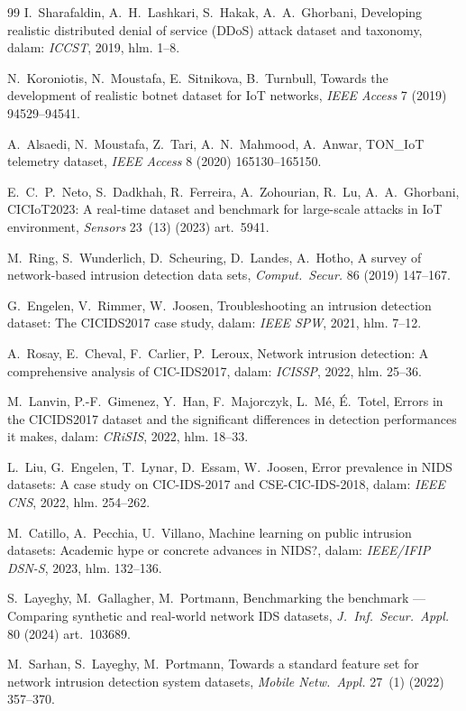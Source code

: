 \documentclass[11pt,a4paper]{article}
\begin{document}
\begin{thebibliography}{99}
 I.~Sharafaldin, A.~H.~Lashkari, S.~Hakak, A.~A.~Ghorbani,
Developing realistic distributed denial of service (DDoS) attack dataset and
taxonomy, dalam: \emph{ICCST}, 2019, hlm. 1--8.

 N.~Koroniotis, N.~Moustafa, E.~Sitnikova, B.~Turnbull, Towards the
development of realistic botnet dataset for IoT networks, \emph{IEEE Access} 7
(2019) 94529--94541.

 A.~Alsaedi, N.~Moustafa, Z.~Tari, A.~N.~Mahmood, A.~Anwar,
TON\_IoT telemetry dataset, \emph{IEEE Access} 8 (2020) 165130--165150.

 E.~C.~P.~Neto, S.~Dadkhah, R.~Ferreira, A.~Zohourian, R.~Lu,
A.~A.~Ghorbani, CICIoT2023: A real-time dataset and benchmark for large-scale
attacks in IoT environment, \emph{Sensors} 23~(13) (2023) art.~5941.

 M.~Ring, S.~Wunderlich, D.~Scheuring, D.~Landes, A.~Hotho, A survey
of network-based intrusion detection data sets, \emph{Comput.\ Secur.} 86 (2019)
147--167.

 G.~Engelen, V.~Rimmer, W.~Joosen, Troubleshooting an intrusion
detection dataset: The CICIDS2017 case study, dalam: \emph{IEEE SPW}, 2021, hlm.
7--12.

 A.~Rosay, E.~Cheval, F.~Carlier, P.~Leroux, Network intrusion
detection: A comprehensive analysis of CIC-IDS2017, dalam: \emph{ICISSP}, 2022,
hlm. 25--36.

 M.~Lanvin, P.-F.~Gimenez, Y.~Han, F.~Majorczyk, L.~M\'e, \'E.~Totel,
Errors in the CICIDS2017 dataset and the significant differences in detection
performances it makes, dalam: \emph{CRiSIS}, 2022, hlm. 18--33.

 L.~Liu, G.~Engelen, T.~Lynar, D.~Essam, W.~Joosen, Error prevalence in
NIDS datasets: A case study on CIC-IDS-2017 and CSE-CIC-IDS-2018, dalam: \emph{IEEE
CNS}, 2022, hlm. 254--262.

 M.~Catillo, A.~Pecchia, U.~Villano, Machine learning on public
intrusion datasets: Academic hype or concrete advances in NIDS?, dalam:
\emph{IEEE/IFIP DSN-S}, 2023, hlm. 132--136.

 S.~Layeghy, M.~Gallagher, M.~Portmann, Benchmarking the benchmark
--- Comparing synthetic and real-world network IDS datasets, \emph{J.\ Inf.\ Secur.\
Appl.} 80 (2024) art.~103689.

 M.~Sarhan, S.~Layeghy, M.~Portmann, Towards a standard feature set
for network intrusion detection system datasets, \emph{Mobile Netw.\ Appl.} 27~(1)
(2022) 357--370.


\end{thebibliography}
\end{document}

